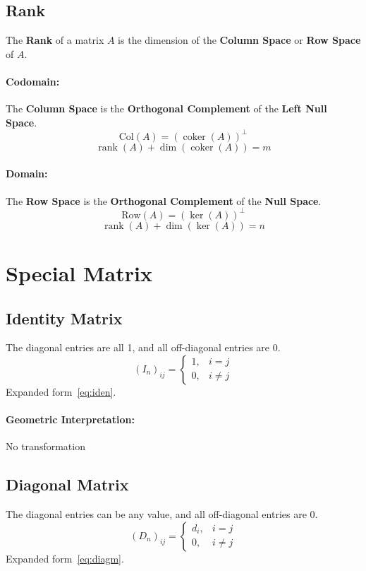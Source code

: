 \documentclass{article}
\begin{document}
\subsection{Rank}
The \textbf{Rank} of a matrix $A$ is the dimension of the \textbf{Column Space} or \textbf{Row Space} of $A$.
\paragraph{Codomain:}
The \textbf{Column Space} is the \textbf{Orthogonal Complement} of the \textbf{Left Null Space}.
\[
    \text{Col}(A) = (\operatorname{coker}(A))^{\perp}
\]
\[
    \operatorname{rank}(A) + \dim(\operatorname{coker}(A)) = m
\]
\paragraph{Domain:}
The \textbf{Row Space} is the \textbf{Orthogonal Complement} of the \textbf{Null Space}.
\[
    \text{Row}(A) = (\ker(A))^{\perp}
\]
\[
    \operatorname{rank}(A) + \dim(\ker(A)) = n
\]


\newpage
\section{Special Matrix}

\subsection{Identity Matrix}
The diagonal entries are all 1, and all off-diagonal entries are 0.
\[
    (I_n)_{ij} =
    \begin{cases}
        1, & i = j \\
        0, & i \neq j
    \end{cases}
\]
Expanded form~\ref{eq:iden}.
\paragraph{Geometric Interpretation:} No transformation

\subsection{Diagonal Matrix}
The diagonal entries can be any value, and all off-diagonal entries are 0.
\[
    (D_n)_{ij} =
    \begin{cases}
        d_i, & i = j \\
        0, & i \neq j
    \end{cases}
\]
Expanded form~\ref{eq:diagm}.
\end{document}
